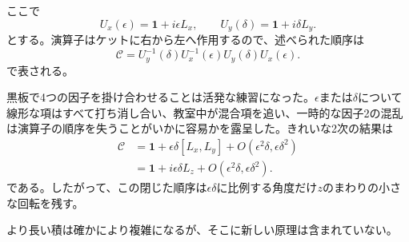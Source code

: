ここで
\begin{equation}
U_x(\epsilon)=\mathbf 1+i\epsilon L_x,
\qquad
U_y(\delta)=\mathbf 1+i\delta L_y.
\end{equation}
とする。演算子はケットに右から左へ作用するので、述べられた順序は
\begin{equation}
\mathcal C
=U_y^{-1}(\delta)U_x^{-1}(\epsilon)
 U_y(\delta)U_x(\epsilon).
\end{equation}
で表される。

\begin{classroomqa}
\end{classroomqa}

黒板で4つの因子を掛け合わせることは活発な練習になった。\(\epsilon\)または\(\delta\)について線形な項はすべて打ち消し合い、教室中が混合項を追い、一時的な因子2の混乱は演算子の順序を失うことがいかに容易かを露呈した。きれいな2次の結果は
\begin{align}
\mathcal C
&=\mathbf 1+\epsilon\delta[L_x,L_y]
  +O(\epsilon^2\delta,\epsilon\delta^2)\\
&=\mathbf 1+i\epsilon\delta L_z
  +O(\epsilon^2\delta,\epsilon\delta^2).
\end{align}
である。したがって、この閉じた順序は\(\epsilon\delta\)に比例する角度だけ\(z\)のまわりの小さな回転を残す。

\begin{classroomqa}
\end{classroomqa}

より長い積は確かにより複雑になるが、そこに新しい原理は含まれていない。

\begin{classroomqa}
\end{classroomqa}

